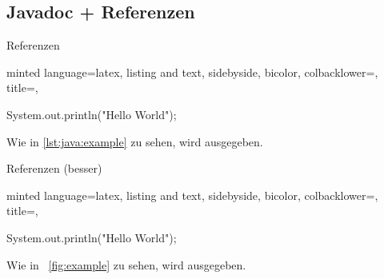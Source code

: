 \documentclass[
    ngerman,
    accentcolor=3b,
    dark_mode,
    fontsize= 12pt,
    a4paper,
    aspectratio=169,
    colorback=true,
    fancy_row_colors,
    leqno,
    fleqn,
    boxarc=3pt,
    fleqn,
]{algoslides}
\begin{document}
    \subsection{Javadoc + Referenzen}
    \begin{frame}[c, fragile]
        \slidehead{}
        Referenzen
        \begin{newcb}[
            fontsize=\scriptsize,
            escapeinside=||,
            ]{
            minted language=latex,
            listing and text,
            sidebyside,
            bicolor,
            colbacklower=,
            title=,
            }
            \label{lst:java:example}
            \begin{codeBlock}[fontsize=\scriptsize]{
            }
                System.out.println("Hello World");
            \end{codeBlock}

            Wie in \ref{lst:java:example} zu sehen, wird  ausgegeben.
        \end{newcb}
    \end{frame}
    \begin{frame}[c, fragile]
        \slidehead{}
        Referenzen (besser)
        \begin{newcb}[
            fontsize=\scriptsize,
            escapeinside=||,
            ]{
            minted language=latex,
            listing and text,
            sidebyside,
            bicolor,
            colbacklower=,
            title=,
            }
            \label{fig:example}
            \begin{codeBlock}[fontsize=\scriptsize]{
            }
                System.out.println("Hello World");
            \end{codeBlock}

            Wie in \figurename{}~\ref{fig:example} zu sehen, wird  ausgegeben.
        \end{newcb}
    \end{frame}
\end{document}
